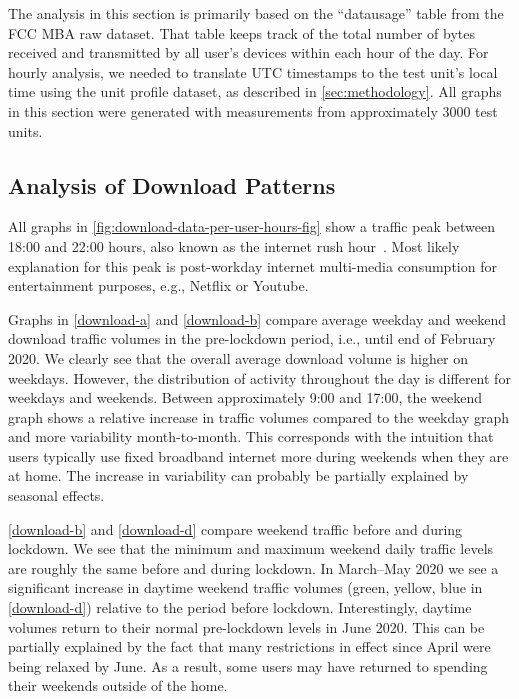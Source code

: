 The analysis in this section is primarily based on the ``datausage'' table from the \gls{FCC} \gls{MBA} raw dataset. That table keeps track of the total number of bytes received and transmitted by all user's devices within each hour of the day. For hourly analysis, we needed to translate \gls{UTC} timestamps to the test unit's local time using the unit profile dataset, as described in \cref{sec:methodology}. All graphs in this section were generated with measurements from approximately 3000 test units.

\subsection{Analysis of Download Patterns}\label{sec:analysis-of-download-patterns}

All graphs in \cref{fig:download-data-per-user-hours-fig} show a traffic peak between 18:00 and 22:00 hours, also known as the internet rush hour~\cite{internetrushhour}. Most likely explanation for this peak is post-workday internet multi-media consumption for entertainment purposes, e.g., Netflix or Youtube.

Graphs in \cref{download-a} and \cref{download-b} compare average weekday and weekend download traffic volumes in the pre-lockdown period, i.e., until end of February 2020. We clearly see that the overall average download volume is higher on weekdays. However, the distribution of activity throughout the day is different for weekdays and weekends. Between approximately 9:00 and 17:00, the weekend graph shows a relative increase in traffic volumes compared to the weekday graph and more variability month-to-month. This corresponds with the intuition that users typically use fixed broadband internet more during weekends when they are at home. The increase in variability can probably be partially explained by seasonal effects.

\cref{download-b} and \cref{download-d} compare weekend traffic before and during lockdown. We see that the minimum and maximum weekend daily traffic levels are roughly the same before and during lockdown. In March--May 2020 we see a significant increase in daytime weekend traffic volumes (green, yellow, blue in \cref{download-d}) relative to the period before lockdown. Interestingly, daytime volumes return to their normal pre-lockdown levels in June 2020. This can be partially explained by the fact that many restrictions in effect since April were being relaxed by June. As a result, some users may have returned to spending their weekends outside of the home. %

